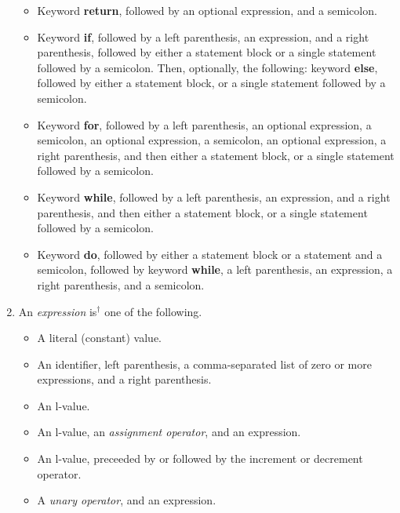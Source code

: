 \documentclass{article}
\newcommand{\iseasier}{is$^\dagger$ }
\begin{document}
\begin{enumerate}
\begin{itemize}
    \item Keyword {\bf return}, followed by an optional expression,
    and a semicolon.

    \item Keyword {\bf if}, followed by a left parenthesis,
    an expression, and a right parenthesis,
    followed by either a statement block or a single statement
    followed by a semicolon.
    Then, optionally, the following:
    keyword {\bf else}, followed by either a statement block,
    or a single statement followed by a semicolon.

    \item Keyword {\bf for}, followed by a left parenthesis,
      an optional expression, a semicolon, an optional expression,
      a semicolon, an optional expression, a right parenthesis,
      and then either a statement block,
      or a single statement followed by a semicolon.

    \item Keyword {\bf while}, followed by a left parenthesis,
      an expression, and a right parenthesis,
      and then either a statement block, or a single statement
      followed by a semicolon.

    \item Keyword {\bf do}, followed by either a statement block
    or a statement and a semicolon,
    followed by keyword {\bf while}, a left parenthesis, an expression,
    a right parenthesis, and a semicolon.

  \end{itemize}

\item
  An \emph{expression} \iseasier one of the following.
  \begin{itemize}
    \item A literal (constant) value.
    \item An identifier, left parenthesis,
    a comma-separated list of zero or more expressions,
    and a right parenthesis.

    \item An l-value.

    \item An l-value, an \emph{assignment operator}, and an expression.

    \item An l-value, preceeded by or followed by the
    increment or decrement operator.

    \item A \emph{unary operator}, and an expression.


\end{itemize}
\end{enumerate}
\end{document}

